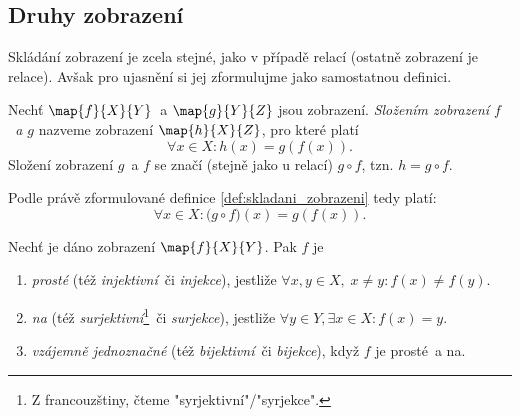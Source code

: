 \subsection{Druhy zobrazení}
Skládání zobrazení je zcela stejné, jako v případě relací (ostatně zobrazení je relace). Avšak pro ujasnění si jej zformulujme jako samostatnou definici.
\begin{definition}\label{def:skladani_zobrazeni}
    Nechť $\map{f}{X}{Y}$~a $\map{g}{Y}{Z}$ jsou zobrazení. \emph{Složením zobrazení $f$~a $g$} nazveme zobrazení $\map{h}{X}{Z}$, pro které platí
    \begin{equation*}
        \forall x\in X: h(x)=g(f(x)).
    \end{equation*}
    Složení zobrazení $g$~a $f$ se značí (stejně jako u relací) $g\circ f$, tzn. $h=g \circ f$.
\end{definition}
Podle právě zformulované definice \ref{def:skladani_zobrazeni} tedy platí:
\begin{equation*}
    \forall x\in X: \bigl(g\circ f\bigr)(x)=g(f(x)).
\end{equation*}
\needspace{1cm}
\begin{definition}\label{def:druhy_zobrazeni}
    Nechť je dáno zobrazení $\map{f}{X}{Y}$. Pak $f$ je
    \begin{enumerate}[label=(\roman*)]
        \item \emph{prosté} (též \emph{injektivní}~či \emph{injekce}), jestliže $\forall x,y\in X,\;x\neq y: f(x)\neq f(y)$.
        \item \emph{na} (též \emph{surjektivní}\footnote{Z francouzštiny, čteme "syrjektivní"/"syrjekce".}~či \emph{surjekce}), jestliže $\forall y\in Y, \exists x\in X: f(x)=y$.
        \item \emph{vzájemně jednoznačné} (též \emph{bijektivní}~či \emph{bijekce}), když $f$ je prosté~a na.
    \end{enumerate}
\end{definition}
